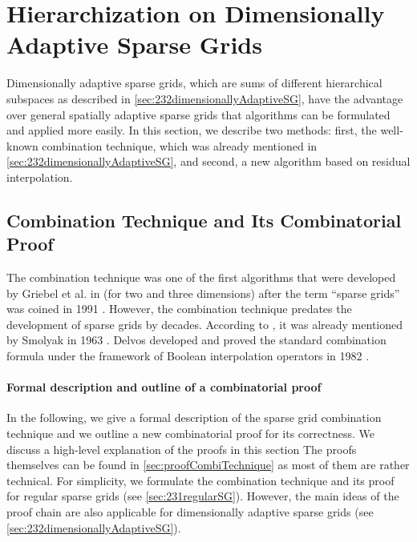 \section{Hierarchization on Dimensionally Adaptive Sparse Grids}
\label{sec:43dimAdaptive}

Dimensionally adaptive sparse grids,
which are sums of different hierarchical subspaces
as described in \cref{sec:232dimensionallyAdaptiveSG},
have the advantage over general spatially adaptive sparse grids
that algorithms can be formulated and applied more easily.
In this section, we describe two methods:
first, the well-known combination technique, which was
already mentioned in \cref{sec:232dimensionallyAdaptiveSG},
and second, a new algorithm based on residual interpolation.



\subsection{Combination Technique and Its Combinatorial Proof}
\label{sec:431combiTechniqueProof}



The combination technique was one of the first algorithms that
were developed by Griebel et al. in \cite{Griebel92Combination}
(for two and three dimensions)
after the term ``sparse grids'' was coined in 1991 \cite{Zenger91Sparse}.
However, the combination technique predates the development of sparse grids
by decades.
According to \cite{Hegland07Combination},
it was already mentioned by Smolyak in 1963 \cite{Smolyak63Quadrature}.
Delvos developed and proved the standard combination formula under the
framework of Boolean interpolation operators in 1982
.

\paragraph{Formal description and outline of a combinatorial proof}

In the following, we give a formal description of the
sparse grid combination technique and we outline a new combinatorial proof
for its correctness.
We discuss a high-level explanation of the proofs in this section
The proofs themselves can be found in \cref{sec:proofCombiTechnique}
as most of them are rather technical.
For simplicity,
we formulate the combination technique and its proof for regular
sparse grids (see \cref{sec:231regularSG}).
However, the main ideas of the proof chain are also applicable
for dimensionally adaptive sparse grids
(see \cref{sec:232dimensionallyAdaptiveSG}).

